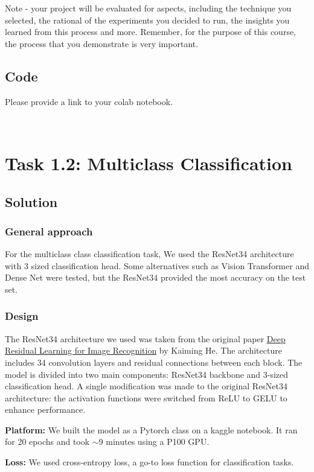 \documentclass{article}
\begin{document}
Note - your project will be evaluated for aspects, including the technique you selected, the rational of the experiments you decided to run, the insights you learned from this process and more. Remember, for the purpose of this course, the process that you demonstrate is very  important.

\subsection{Code}

Please provide a link to your colab notebook.

\
\section{Task 1.2: Multiclass Classification}

\subsection{Solution}
\subsubsection{General approach}
For the multiclass class classification task, We used the ResNet34 architecture with 3 sized classification head. Some alternatives such as Vision Transformer and Dense Net were tested, but the ResNet34 provided the most accuracy on the test set.

\subsubsection{Design}
The ResNet34 architecture we used was taken from the original paper \href{https://arxiv.org/pdf/1512.03385.pdf}{Deep Residual Learning for Image Recognition} by Kaiming He. The architecture includes 34 convolution layers and residual connections between each block. The model is divided into two main components: ResNet34 backbone and 3-sized classification head. A single modification was made to the original ResNet34 architecture: the activation functions were switched from ReLU to GELU to enhance performance.

\textbf{Platform:} We built the model as a Pytorch class on a kaggle notebook. It ran for 20 epochs and took $\sim$9 minutes using a P100 GPU. 

\textbf{Loss:} We used cross-entropy loss, a go-to loss function for classification tasks.
\end{document}
